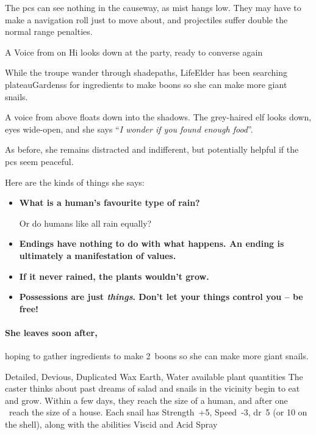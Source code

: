\begin{multicols}{2}
The \glspl{pc} can see nothing in the causeway, as mist hangs low.
They may have to make a navigation roll just to move about, and projectiles suffer double the normal range penalties.

{A Voice from on Hi}%
{ looks down at the party, ready to converse again}%

While the troupe wander through \gls{shadepaths}, \gls{LifeElder} has been searching \glspl{plateauGardens} for \glspl{ingredient} to make \glspl{boon} so she can make more giant snails.

\begin{boxtext}
  A voice from above floats down into the shadows.
  The grey-haired elf looks down, eyes wide-open, and she says ``\textit{I wonder if you found enough food}''.
\end{boxtext}

As before, she remains distracted and indifferent, but potentially helpful if the \glspl{pc} seem peaceful.

Here are the kinds of things she says:

\begin{itemize}
  \item[\adforn{54}]\bf
  What is a human's favourite type of rain?

  Or do humans like all rain equally?
  \item[\adforn{54}]\bf
  Endings have nothing to do with what happens.
  An ending is ultimately a manifestation of values.
  \item[\adforn{54}]\bf
  If it never rained, the plants wouldn't grow.
  \item[\adforn{54}]\bf
  Possessions are just \emph{things}.
  Don't let your things control you -- be free!
\end{itemize}

\paragraph{She leaves soon after,}
hoping to gather \glspl{ingredient} to make 2~\glspl{boon} so she can make more giant snails.

  {Detailed, Devious, Duplicated}%
  {Wax}%
  {Earth, Water}%
  {available plant quantities}%
  {The caster thinks about past dreams of salad and  snails in the vicinity begin to eat and grow.
  Within a few days, they reach the size of a human, and after one \showOnset\ reach the size of a house.
  Each snail has Strength~+5, Speed~-3, \gls{dr}~5 (or 10 on the shell), along with the abilities Viscid and Acid Spray}%
  {}



\end{multicols}
